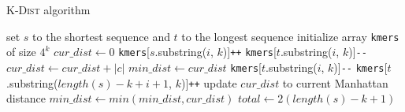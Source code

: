 \begin{algorithm}
  \caption{\textsc{K-Dist} algorithm}
  \label{alg:K-Dist}
  \begin{algorithmic}[1]
    \Statex
      \State set $s$ to the shortest sequence and $t$ to the longest sequence
      \State initialize array \texttt{kmers} of size $4^k$
      \State $cur\_dist \gets 0$
        \State \texttt{kmers}[$s$.substring($i$, $k$)]\texttt{++}
        \State \texttt{kmers}[$t$.substring($i$, $k$)]\texttt{-{}-}
      \EndFor
        \State $cur\_dist \gets cur\_dist + |c|$
      \EndFor
      \State $min\_dist \gets cur\_dist$
        \State \texttt{kmers}[$t$.substring($i$, $k$)]\texttt{-{}-}
        \State \texttt{kmers}[$t$.substring($length(s)-k+i+1$, $k$)]\texttt{++}
        \State update $cur\_dist$ to current Manhattan distance
        \State $min\_dist \gets min(min\_dist, cur\_dist)$
      \EndFor
          \State $total \gets 2(length(s)-k+1)$
      \State {}
    \EndFunction
  \end{algorithmic}
\end{algorithm}
